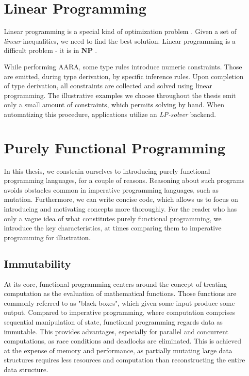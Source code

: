 \section{Linear Programming}\label{sec:linear-programming}

Linear programming \cite{LinearProgramming2023} is a special kind of optimization problem \cite{OptimizationProblem2022}. Given a set of \emph{linear} inequalities, we need to find the best solution. Linear programming is a difficult problem - it is in \textbf{NP} \cite[page~56]{aroraComputationalComplexityModern2009}. 

While performing AARA, some type rules introduce numeric constraints. Those are emitted, during type derivation, by specific inference rules. Upon completion of type derivation, all constraints are collected and solved using linear programming. The illustrative examples we choose throughout the thesis emit only a small amount of constraints, which permits solving by hand. When automatizing this procedure, applications utilize an \emph{LP-solver} backend.

\section{Purely Functional Programming}\label{sec:functional-programming}

In this thesis, we constrain ourselves to introducing purely functional programming languages, for a couple of reasons. Reasoning about such programs avoids obstacles common in imperative programming languages, such as mutation. Furthermore, we can write concise code, which allows us to focus on introducing and motivating concepts more thoroughly. For the reader who has only a vague idea of what constitutes purely functional programming, we introduce the key characteristics, at times comparing them to imperative programming for illustration.

\subsection{Immutability}

At its core, functional programming centers around the concept of treating computation as the evaluation of mathematical functions. Those functions are commonly referred to as "black boxes", which given some input produce some output. Compared to imperative programming, where computation comprises sequential manipulation of state, functional programming regards data as immutable. This provides advantages, especially for parallel and concurrent computations, as race conditions and deadlocks are eliminated. This is achieved at the expense of memory and performance, as partially mutating large data structures requires less resources and computation than reconstructing the entire data structure.

